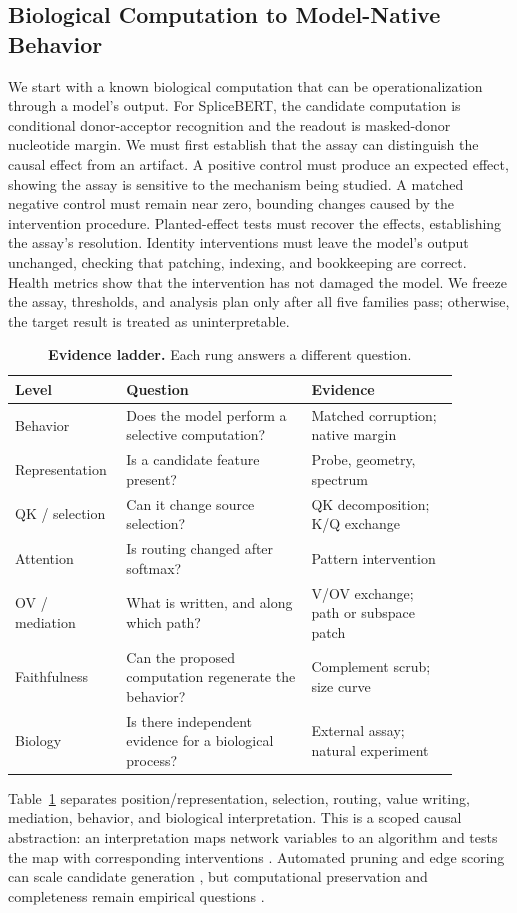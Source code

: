 \documentclass{article}
\begin{document}
\subsection{Biological Computation to Model-Native Behavior}
\label{sec:comp-behavior}

We start with a known biological computation that can be operationalization through a model's output. For SpliceBERT, the candidate computation is conditional donor-acceptor recognition and the readout is masked-donor nucleotide margin. We must first establish that the assay can distinguish the causal effect from an artifact. A positive control must produce an expected effect, showing the assay is sensitive to the mechanism being studied. A matched negative control must remain near zero, bounding changes caused by the intervention procedure. Planted-effect tests must recover the effects, establishing the assay's resolution. Identity interventions must leave the model's output unchanged, checking that patching, indexing, and bookkeeping are correct. Health metrics show that the intervention has not damaged the model. We freeze the assay, thresholds, and analysis plan only after all five families pass; otherwise, the target result is treated as uninterpretable.

\begin{table}[t]
  \caption{\textbf{Evidence ladder.} Each rung answers a different question. }
  \label{tab:ladder}
  \centering
  \small
  \setlength{\tabcolsep}{4.5pt}
  \begin{tabular}{p{0.18\linewidth}p{0.39\linewidth}p{0.31\linewidth}}
    \toprule
    Level & Question & Evidence\\
    \midrule
    Behavior & Does the model perform a selective computation?& Matched corruption;
    native margin \\
    Representation & Is a candidate feature present? & Probe, geometry, spectrum \\
    QK / selection & Can it change source selection? & QK decomposition; K/Q exchange \\
    Attention & Is routing changed after softmax? & Pattern intervention \\
    OV / mediation & What is written, and along which path? & V/OV exchange; path or subspace patch \\
    Faithfulness & Can the proposed computation regenerate the behavior?& Complement scrub; size curve \\
    Biology & Is there independent evidence for a biological process?& External assay; natural experiment\\
    \bottomrule
  \end{tabular}
\end{table}
Table~\ref{tab:ladder} separates position/representation, selection, routing, value writing, mediation, behavior, and biological interpretation.  This is a scoped causal abstraction: an interpretation maps network variables to an algorithm and tests the map with corresponding interventions \citep{geiger2025causal}.  Automated pruning and edge scoring can scale candidate generation \citep{conmy2023acdc,syed2024eap}, but computational preservation and completeness remain empirical questions \citep{wang2023ioi,mueller2025mib}.
\end{document}
